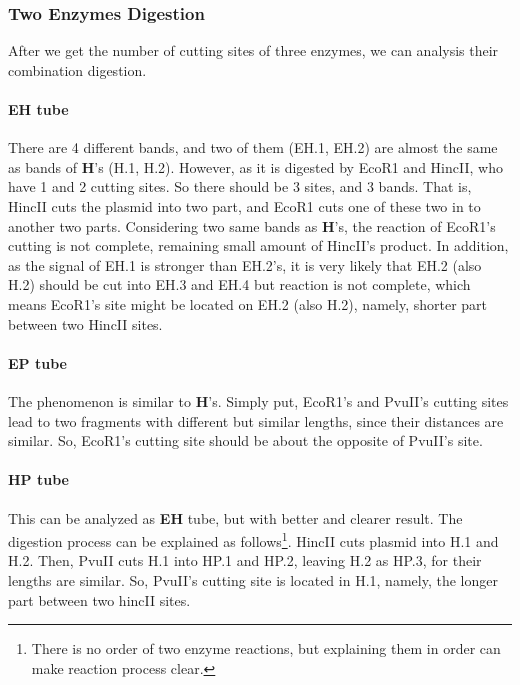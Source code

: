 \documentclass{article}
\begin{document}
            \subsubsection{Two Enzymes Digestion}
                After we get the number of cutting sites of three enzymes, we can analysis their combination digestion.

                \paragraph{\textbf{EH} tube} There are 4 different bands, and two of them (EH.1, EH.2) are almost the same as bands of \textbf{H}'s (H.1, H.2). However, as it is digested by EcoR1 and HincII, who have 1 and 2 cutting sites. So there should be 3 sites, and 3 bands. That is, HincII cuts the plasmid into two part, and EcoR1 cuts one of these two in to another two parts. Considering two same bands as \textbf{H}'s, the reaction of EcoR1's cutting is not complete, remaining small amount of HincII's product. In addition, as the signal of EH.1 is stronger than EH.2's, it is very likely that EH.2 (also H.2) should be cut into EH.3 and EH.4 but reaction is not complete, which means EcoR1's site might be located on EH.2 (also H.2), namely, shorter part between two HincII sites.

                \paragraph{\textbf{EP} tube} The phenomenon is similar to \textbf{H}'s. Simply put, EcoR1's and PvuII's cutting sites lead to two fragments with different but similar lengths, since their distances are similar. So, EcoR1's cutting site should be about the opposite of PvuII's site.

                \paragraph{\textbf{HP} tube} This can be analyzed as \textbf{EH} tube, but with better and clearer result. The digestion process can be explained as follows\footnote{There is no order of two enzyme reactions, but explaining them in order can make reaction process clear.}. HincII cuts plasmid into H.1 and H.2. Then, PvuII cuts H.1 into HP.1 and HP.2, leaving H.2 as HP.3, for their lengths are similar. So, PvuII's cutting site is located in H.1, namely, the longer part between two hincII sites.
\end{document}
